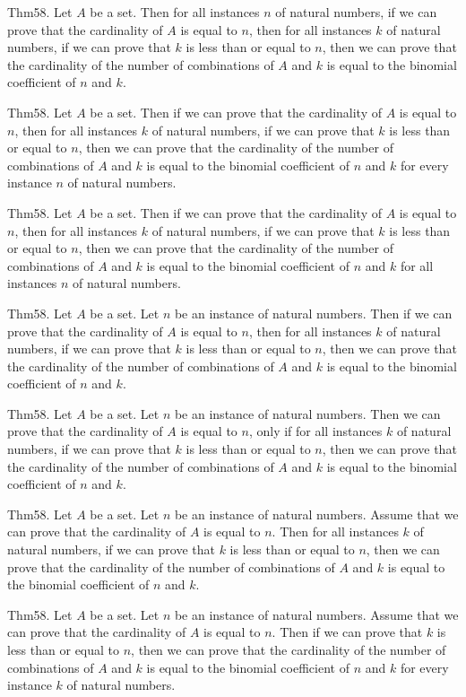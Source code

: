 \documentclass{article}
\begin{document}
Thm58. Let $A$ be a set. Then for all instances $n$ of natural numbers, if we can prove that the cardinality of $A$ is equal to $n$, then for all instances $k$ of natural numbers, if we can prove that $k$ is less than or equal to $n$, then we can prove that the cardinality of the number of combinations of $A$ and $k$ is equal to the binomial coefficient of $n$ and $k$.

Thm58. Let $A$ be a set. Then if we can prove that the cardinality of $A$ is equal to $n$, then for all instances $k$ of natural numbers, if we can prove that $k$ is less than or equal to $n$, then we can prove that the cardinality of the number of combinations of $A$ and $k$ is equal to the binomial coefficient of $n$ and $k$ for every instance $n$ of natural numbers.

Thm58. Let $A$ be a set. Then if we can prove that the cardinality of $A$ is equal to $n$, then for all instances $k$ of natural numbers, if we can prove that $k$ is less than or equal to $n$, then we can prove that the cardinality of the number of combinations of $A$ and $k$ is equal to the binomial coefficient of $n$ and $k$ for all instances $n$ of natural numbers.

Thm58. Let $A$ be a set. Let $n$ be an instance of natural numbers. Then if we can prove that the cardinality of $A$ is equal to $n$, then for all instances $k$ of natural numbers, if we can prove that $k$ is less than or equal to $n$, then we can prove that the cardinality of the number of combinations of $A$ and $k$ is equal to the binomial coefficient of $n$ and $k$.

Thm58. Let $A$ be a set. Let $n$ be an instance of natural numbers. Then we can prove that the cardinality of $A$ is equal to $n$, only if for all instances $k$ of natural numbers, if we can prove that $k$ is less than or equal to $n$, then we can prove that the cardinality of the number of combinations of $A$ and $k$ is equal to the binomial coefficient of $n$ and $k$.

Thm58. Let $A$ be a set. Let $n$ be an instance of natural numbers. Assume that we can prove that the cardinality of $A$ is equal to $n$. Then for all instances $k$ of natural numbers, if we can prove that $k$ is less than or equal to $n$, then we can prove that the cardinality of the number of combinations of $A$ and $k$ is equal to the binomial coefficient of $n$ and $k$.

Thm58. Let $A$ be a set. Let $n$ be an instance of natural numbers. Assume that we can prove that the cardinality of $A$ is equal to $n$. Then if we can prove that $k$ is less than or equal to $n$, then we can prove that the cardinality of the number of combinations of $A$ and $k$ is equal to the binomial coefficient of $n$ and $k$ for every instance $k$ of natural numbers.
\end{document}
